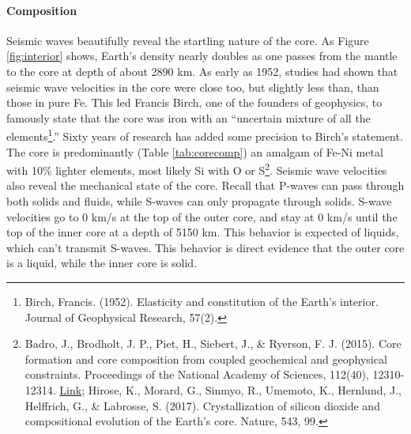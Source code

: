 \paragraph{Composition}
Seismic waves beautifully reveal the startling nature of the core. As Figure \ref{fig:interior} shows, Earth's density nearly doubles as one passes from the mantle to the core at depth of about 2890 km. As early as 1952, studies had shown that seismic wave velocities in the core were close too, but slightly less than, than those in pure Fe. This led Francis Birch, one of the founders of geophysics, to famously state that the core was iron with an ``uncertain mixture of all the elements\footnote{Birch, Francis. (1952). Elasticity and constitution of the Earth's interior. Journal of Geophysical Research, 57(2).}.'' Sixty years of research has added some precision to Birch's statement. The core is predominantly (Table \ref{tab:corecomp}) an amalgam of Fe-Ni metal with 10\% lighter elements, most likely Si with O or S\footnote{Badro, J., Brodholt, J. P., Piet, H., Siebert, J., \& Ryerson, F. J. (2015). Core formation and core composition from coupled geochemical and geophysical constraints. Proceedings of the National Academy of Sciences, 112(40), 12310-12314. \href{https://doi.org/10.1073/pnas.1505672112}{Link}; Hirose, K., Morard, G., Sinmyo, R., Umemoto, K., Hernlund, J., Helffrich, G., \& Labrosse, S. (2017). Crystallization of silicon dioxide and compositional evolution of the Earth's core. Nature, 543, 99.}. Seismic wave velocities also reveal the mechanical state of the core. Recall that P-waves can pass through both solids and fluids, while S-waves can only propagate through solids. S-wave velocities go to 0 km/s at the top of the outer core, and stay at 0 km/s until the top of the inner core at a depth of 5150 km. This behavior is expected of liquids, which can't transmit S-waves. This behavior is direct evidence that the outer core is a liquid, while the inner core is solid.

